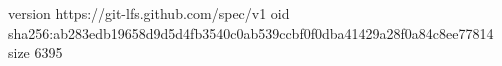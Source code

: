 version https://git-lfs.github.com/spec/v1
oid sha256:ab283edb19658d9d5d4fb3540c0ab539ccbf0f0dba41429a28f0a84c8ee77814
size 6395
